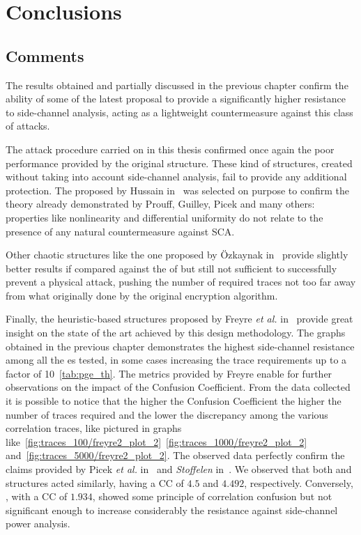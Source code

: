\chapter{Conclusions}\label{chap:conclusions}

\section{Comments}
    The results obtained and partially discussed in the previous chapter confirm the ability of some of the latest \sbocs{} proposal to provide a significantly higher resistance to side-channel analysis, acting as a lightweight countermeasure against this class of attacks. 
    
    The attack procedure carried on in this thesis confirmed once again the poor performance provided by the original \aes{} \sbocs{} structure. These kind of structures, created without taking into account side-channel analysis, fail to provide any additional protection. The \sbocs{} proposed by Hussain in~\cite{hussain2013efficient} was selected on purpose to confirm the theory already demonstrated by Prouff, Guilley, Picek and many others: properties like nonlinearity and differential uniformity do not relate to the presence of any natural countermeasure against SCA.
    
    Other chaotic structures like the one proposed by Özkaynak in~\cite{ozkaynak2019construction} provide slightly better results if compared against the \sbocs{} of \aes{} but still not sufficient to successfully prevent a physical attack, pushing the number of required traces not too far away from what originally done by the original encryption algorithm.

    Finally, the heuristic-based structures proposed by Freyre \emph{et al.} in~\cite{freyre2020evolving} provide great insight on the state of the art achieved by this design methodology. The graphs obtained in the previous chapter demonstrates the highest side-channel resistance among all the \sbocs{}es tested, in some cases increasing the trace requirements up to a factor of 10~\ref{tab:pge_th}. The metrics provided by Freyre enable for further observations on the impact of the Confusion Coefficient. From the data collected it is possible to notice that the higher the Confusion Coefficient the higher the number of traces required and the lower the discrepancy among the various correlation traces, like pictured in graphs like~\ref{fig:traces_100/freyre2_plot_2}~\ref{fig:traces_1000/freyre2_plot_2} and~\ref{fig:traces_5000/freyre2_plot_2}. The observed data perfectly confirm the claims provided by Picek \emph{et al.} in~\cite{picek2014confused} and \emph{Stoffelen} in~\cite{stoffelen2015intrinsic}. We observed that both \xfone{} and \xftwo{} structures acted similarly, having a CC of $4.5$ and $4.492$, respectively. Conversely, \xfthree{}, with a CC of $1.934$, showed some principle of correlation confusion but not significant enough to increase considerably the resistance against side-channel power analysis.

